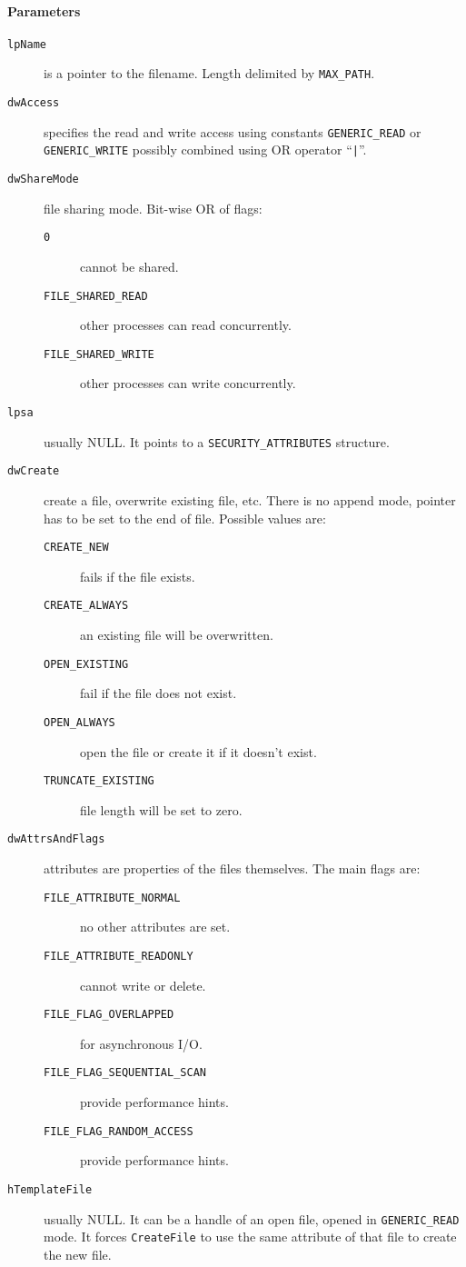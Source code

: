\paragraph{Parameters}
\begin{description}
\item [\texttt{lpName}] is a pointer to the filename. Length delimited by \texttt{MAX\_PATH}.
\item [\texttt{dwAccess}] specifies the read and write access using constants \texttt{GENERIC\_READ} or \texttt{GENERIC\_WRITE} possibly combined using OR operator ``\texttt{|}''.
\item [\texttt{dwShareMode}] file sharing mode. Bit-wise OR of flags:
\begin{description}
\item [\texttt{0}] cannot be shared.
\item [\texttt{FILE\_SHARED\_READ}] other processes can read concurrently.
\item [\texttt{FILE\_SHARED\_WRITE}] other processes can write concurrently.
\end{description}
\item [\texttt{lpsa}] usually NULL. It points to a \texttt{SECURITY\_ATTRIBUTES} structure.
\item [\texttt{dwCreate}] create a file, overwrite existing file, etc. There is no append mode, pointer has to be set to the end of file. Possible values are:
\begin{description}
\item [\texttt{CREATE\_NEW}] fails if the file exists.
\item [\texttt{CREATE\_ALWAYS}] an existing file will be overwritten.
\item [\texttt{OPEN\_EXISTING}] fail if the file does not exist.
\item [\texttt{OPEN\_ALWAYS}] open the file or create it if it doesn't exist.
\item [\texttt{TRUNCATE\_EXISTING}] file length will be set to zero.
\end{description}
\item [\texttt{dwAttrsAndFlags}] attributes are properties of the files themselves. The main flags are:
\begin{description}
\item [\texttt{FILE\_ATTRIBUTE\_NORMAL}] no other attributes are set.
\item [\texttt{FILE\_ATTRIBUTE\_READONLY}] cannot write or delete.
\item [\texttt{FILE\_FLAG\_OVERLAPPED}] for asynchronous I/O.
\item [\texttt{FILE\_FLAG\_SEQUENTIAL\_SCAN}] provide performance hints.
\item [\texttt{FILE\_FLAG\_RANDOM\_ACCESS}] provide performance hints.
\end{description}
\item [\texttt{hTemplateFile}] usually NULL. It can be a handle of an open file, opened in \texttt{GENERIC\_READ} mode. It forces \texttt{CreateFile} to use the same attribute of that file to create the new file.
\end{description}

